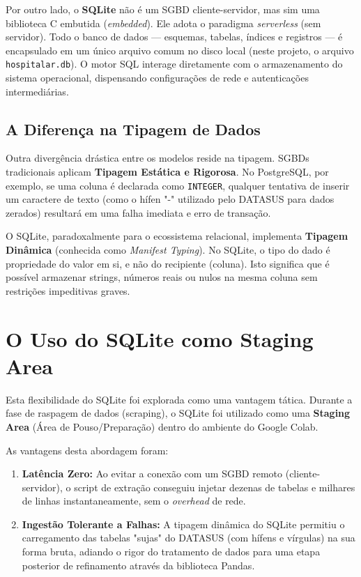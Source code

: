 \documentclass[12pt,a4paper]{report}
\begin{document}
Por outro lado, o \textbf{SQLite} não é um SGBD cliente-servidor, mas sim uma biblioteca C embutida (\textit{embedded}). Ele adota o paradigma \textit{serverless} (sem servidor). Todo o banco de dados — esquemas, tabelas, índices e registros — é encapsulado em um único arquivo comum no disco local (neste projeto, o arquivo \texttt{hospitalar.db}). O motor SQL interage diretamente com o armazenamento do sistema operacional, dispensando configurações de rede e autenticações intermediárias.

\subsection{A Diferença na Tipagem de Dados}
Outra divergência drástica entre os modelos reside na tipagem. SGBDs tradicionais aplicam \textbf{Tipagem Estática e Rigorosa}. No PostgreSQL, por exemplo, se uma coluna é declarada como \texttt{INTEGER}, qualquer tentativa de inserir um caractere de texto (como o hífen "-" utilizado pelo DATASUS para dados zerados) resultará em uma falha imediata e erro de transação.

O SQLite, paradoxalmente para o ecossistema relacional, implementa \textbf{Tipagem Dinâmica} (conhecida como \textit{Manifest Typing}). No SQLite, o tipo do dado é propriedade do valor em si, e não do recipiente (coluna). Isto significa que é possível armazenar strings, números reais ou nulos na mesma coluna sem restrições impeditivas graves.

\section{O Uso do SQLite como Staging Area}
Esta flexibilidade do SQLite foi explorada como uma vantagem tática. Durante a fase de raspagem de dados (scraping), o SQLite foi utilizado como uma \textbf{Staging Area} (Área de Pouso/Preparação) dentro do ambiente do Google Colab.

As vantagens desta abordagem foram:
\begin{enumerate}
\item \textbf{Latência Zero:} Ao evitar a conexão com um SGBD remoto (cliente-servidor), o script de extração conseguiu injetar dezenas de tabelas e milhares de linhas instantaneamente, sem o \textit{overhead} de rede.
\item \textbf{Ingestão Tolerante a Falhas:} A tipagem dinâmica do SQLite permitiu o carregamento das tabelas "sujas" do DATASUS (com hífens e vírgulas) na sua forma bruta, adiando o rigor do tratamento de dados para uma etapa posterior de refinamento através da biblioteca Pandas.
\end{enumerate}
\end{document}
